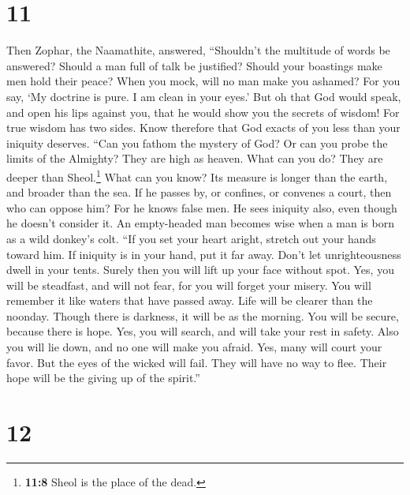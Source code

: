 \hypertarget{section-10}{%
\section{11}\label{section-10}}

 Then Zophar, the Naamathite, answered, 
``Shouldn't the multitude of words be answered? Should a man full of
talk be justified?  Should your boastings make men hold
their peace? When you mock, will no man make you ashamed? 
For you say, `My doctrine is pure. I am clean in your eyes.'
 But oh that God would speak, and open his lips against
you,  that he would show you the secrets of wisdom! For
true wisdom has two sides. Know therefore that God exacts of you less
than your iniquity deserves.  ``Can you fathom the mystery
of God? Or can you probe the limits of the Almighty?  They
are high as heaven. What can you do? They are deeper than
Sheol.\footnote{\textbf{11:8} Sheol is the place of the dead.} What can
you know?  Its measure is longer than the earth, and
broader than the sea.  If he passes by, or confines, or
convenes a court, then who can oppose him?  For he knows
false men. He sees iniquity also, even though he doesn't consider it.
 An empty-headed man becomes wise when a man is born as a
wild donkey's colt.  ``If you set your heart aright,
stretch out your hands toward him.  If iniquity is in
your hand, put it far away. Don't let unrighteousness dwell in your
tents.  Surely then you will lift up your face without
spot. Yes, you will be steadfast, and will not fear,  for
you will forget your misery. You will remember it like waters that have
passed away.  Life will be clearer than the noonday.
Though there is darkness, it will be as the morning.  You
will be secure, because there is hope. Yes, you will search, and will
take your rest in safety.  Also you will lie down, and no
one will make you afraid. Yes, many will court your favor.
 But the eyes of the wicked will fail. They will have no
way to flee. Their hope will be the giving up of the spirit.''

\hypertarget{section-11}{%
\section{12}\label{section-11}}

